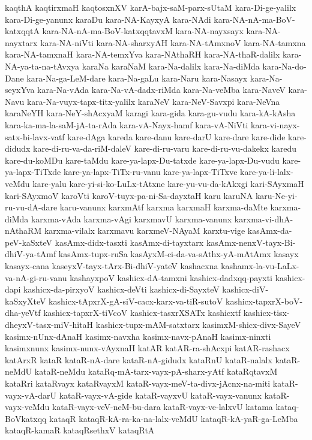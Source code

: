{kaqthA
kaqtirxmaH
kaqtosxnXV
karA-bajx-saM-parx-sUtaM
kara-Di-ge-yalilx
kara-Di-ge-yanunx
karaDu
kara-NA-KayxyA
kara-NAdi
kara-NA-nA-ma-BoV-katxqqtA
kara-NA-nA-ma-BoV-katxqqtavxM
kara-NA-nayxsayx
kara-NA-nayxtarx
kara-NA-niVti
kara-NA-sharxyAH
kara-NA-tAmxnoV
kara-NA-tamxna
kara-NA-tamxnaH
kara-NA-temxYva
kara-NAthaRH
kara-NA-thaR-dalilx
kara-NA-ya-ta-na-tAvxya
karaNa
karaNaM
kara-Na-dalilx
kara-Na-diMda
kara-Na-do-Dane
kara-Na-ga-LeM-dare
kara-Na-gaLu
kara-Naru
kara-Nasayx
kara-Na-seyxYva
kara-Na-vAda
kara-Na-vA-dadx-riMda
kara-Na-veMba
kara-NaveV
kara-Navu
kara-Na-vuyx-tapx-titx-yalilx
karaNeV
kara-NeV-Savxpi
kara-NeVna
karaNeYH
kara-NeY-shAcxyaM
karagi
kara-gida
kara-gu-vudu
kara-kA-kAsha
kara-ka-ma-la-saM-jA-ta-rAda
kara-vA-Nayx-hamf
kara-vA-NiVti
kara-vi-nayx-satx-bi-lavx-vatf
kare-dAga
kareda
kare-danu
kare-darU
kare-dare
kare-dide
kare-didudx
kare-di-ru-va-da-riM-daleV
kare-di-ru-varu
kare-di-ru-vu-dakekx
karedu
kare-du-koMDu
kare-taMdu
kare-ya-lapx-Du-tatxde
kare-ya-lapx-Du-vudu
kare-ya-lapx-TiTxde
kare-ya-lapx-TiTx-ru-vanu
kare-ya-lapx-TiTxve
kare-ya-li-lalx-veMdu
kare-yalu
kare-yi-si-ko-LuLx-tAtxne
kare-yu-vu-da-kAkxgi
kari-SAyxmaH
kari-SAyxmoV
karoVti
karoV-tuyx-pa-ni-Sa-dayxtaH
karu
karuNA
karu-Ne-yi-ru-vu-dA-dare
karu-vanunx
karxmAtf
karxma
karxmaH
karxma-daMte
karxma-diMda
karxma-vAda
karxma-vAgi
karxmavU
karxma-vanunx
karxma-vi-dhA-nAthaRM
karxma-vilalx
karxmavu
karxmeV-NAyaM
karxtu-vige
kasAmx-da-peV-kaSxteV
kasAmx-didx-tasxti
kasAmx-di-tayxtarx
kasAmx-nenxV-tayx-Bi-dhiV-ya-tAmf
kasAmx-tupx-ruSa
kasAyxM-ci-da-va-sAthx-yA-mAtAmx
kasayx
kasayx-cana
kaseyxV-tayx-tArx-Bi-dhiV-yateV
kashacxna
kashamx-la-vu-LaLx-va-nA-gi-ru-vanu
kashayxpoV
kashicx-dA-tamxni
kashicx-dadxqq-payxti
kashicx-dapi
kashicx-da-pirxyoV
kashicx-deVti
kashicx-di-SayxteV
kashicx-diV-kaSxyXteV
kashicx-tApxrX-gA-siV-cacx-karx-va-tiR-sutoV
kashicx-tapxrX-boV-dha-yeVtf
kashicx-tapxrX-tiVcoV
kashicx-tasxrXSATx
kashicxtf
kashicx-tisx-dheyxV-tasx-miV-hitaH
kashicx-tupx-mAM-satxtarx
kasimxM-shicx-divx-SayeV
kasimx-nUnx-dAnaH
kasimx-navxha
kasimx-navx-pAnaH
kasimx-ninxti
kasimxnunx
kasimx-nunx-vAyxnaH
katAR
katAR-ra-shAcxpi
katAR-rashacx
katArxR
kataR
kataR-nA-dare
kataR-nA-gidudx
kataRnU
kataR-nalalx
kataR-neMdU
kataR-neMdu
kataRq-mA-tarx-vayx-pA-sharx-yAtf
kataRqtavxM
kataRri
kataRvayx
kataRvayxM
kataR-vayx-meV-ta-divx-jAcnx-na-miti
kataR-vayx-vA-darU
kataR-vayx-vA-gide
kataR-vayxvU
kataR-vayx-vanunx
kataR-vayx-veMdu
kataR-vayx-veV-neM-bu-dara
kataR-vayx-ve-lalxvU
katama
kataq-BoVkatxqq
kataqR
kataqR-kA-ra-ka-na-lalx-veMdU
kataqR-kA-yaR-ga-LeMba
kataqR-kamaR
kataqRsethxV
kataqRtA
}
